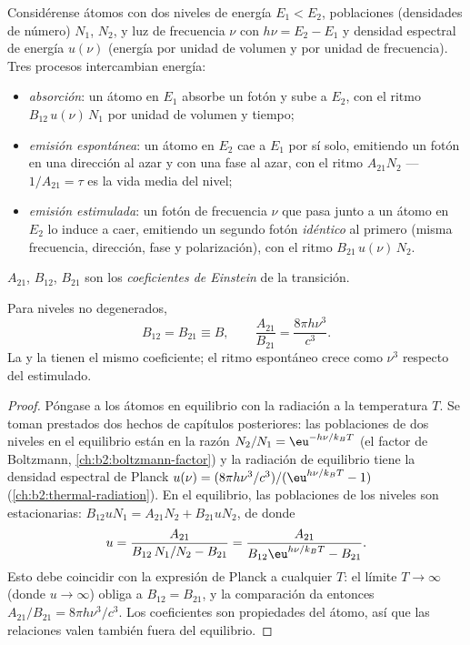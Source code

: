 \begin{definition}\label{def:b2:laser:processes}
Considérense átomos con dos niveles de energía $E_1 < E_2$, poblaciones (densidades
de número) $N_1$, $N_2$, y luz de frecuencia $\nu$ con
$h\nu = E_2 - E_1$ y densidad espectral de energía $u(\nu)$ (energía por unidad de
volumen y por unidad de frecuencia). Tres procesos intercambian energía:
\begin{itemize}
\item \emph{absorción}: un átomo en
      $E_1$ absorbe un fotón y sube a $E_2$, con el ritmo
      $B_{12}\,u(\nu)\,N_1$ por unidad de volumen y tiempo;
\item \emph{emisión espontánea}: un átomo
      en $E_2$ cae a $E_1$ por sí solo, emitiendo un fotón en una dirección
      al azar y con una fase al azar, con el ritmo $A_{21}N_2$ ---
      $1/A_{21} = \tau$ es la vida media del nivel;
\item \emph{emisión estimulada}: un fotón
      de frecuencia $\nu$ que pasa junto a un átomo en $E_2$ lo induce a caer,
      emitiendo un segundo fotón \emph{idéntico} al primero (misma
      frecuencia, dirección, fase y polarización), con el ritmo
      $B_{21}\,u(\nu)\,N_2$.
\end{itemize}
$A_{21}$, $B_{12}$, $B_{21}$ son los \emph{coeficientes de
Einstein} de la transición.
\end{definition}

\begin{proposition}\label{prop:b2:laser:einstein}
Para niveles no degenerados,
\[
B_{12} = B_{21} \equiv B, \qquad
\frac{A_{21}}{B_{21}} = \frac{8\pi h\nu^3}{c^3}.
\]
La  y la  tienen el mismo coeficiente; el
ritmo espontáneo crece como $\nu^3$ respecto del estimulado.
\end{proposition}

\begin{proof}
Póngase a los átomos en equilibrio con la radiación a la temperatura $T$. Se toman
prestados dos hechos de capítulos posteriores: las poblaciones de dos niveles
en el equilibrio están en la razón $N_2/N_1 = \eu^{-h\nu/k_BT}$ (el
factor de Boltzmann, \cref{ch:b2:boltzmann-factor}) y la radiación
de equilibrio tiene la densidad espectral de Planck
$u(\nu) = (8\pi h\nu^3/c^3)/(\eu^{h\nu/k_BT} - 1)$
(\cref{ch:b2:thermal-radiation}). En el equilibrio, las poblaciones de los niveles
son estacionarias: $B_{12}uN_1 = A_{21}N_2 + B_{21}uN_2$, de donde
\[
u = \frac{A_{21}}{B_{12}\,N_1/N_2 - B_{21}}
  = \frac{A_{21}}{B_{12}\eu^{h\nu/k_BT} - B_{21}}.
\]
Esto debe coincidir con la expresión de Planck a cualquier $T$: el límite
$T \to \infty$ (donde $u \to \infty$) obliga a $B_{12} = B_{21}$, y la
comparación da entonces $A_{21}/B_{21} = 8\pi h\nu^3/c^3$. Los
coeficientes son propiedades del átomo, así que las relaciones valen también fuera del
equilibrio.
\end{proof}

